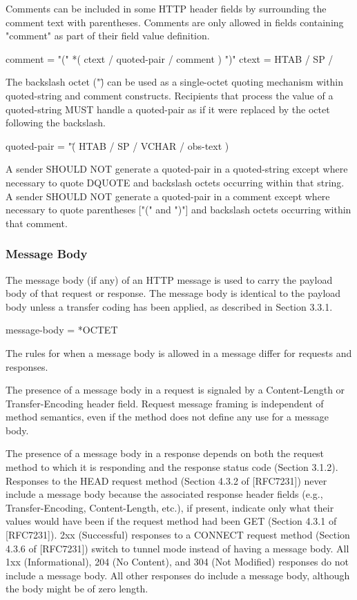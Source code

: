 Comments can be included in some HTTP header fields by surrounding
the comment text with parentheses.  Comments are only allowed in
fields containing "comment" as part of their field value definition.

  comment        = "(" *( ctext / quoted-pair / comment ) ")"
  ctext          = HTAB / SP / %

The backslash octet ("\") can be used as a single-octet quoting
mechanism within quoted-string and comment constructs.  Recipients
that process the value of a quoted-string MUST handle a quoted-pair
as if it were replaced by the octet following the backslash.

  quoted-pair    = "\" ( HTAB / SP / VCHAR / obs-text )

A sender SHOULD NOT generate a quoted-pair in a quoted-string except
where necessary to quote DQUOTE and backslash octets occurring within
that string.  A sender SHOULD NOT generate a quoted-pair in a comment
except where necessary to quote parentheses ["(" and ")"] and
backslash octets occurring within that comment.
\subsubsection{Message Body }
The message body (if any) of an HTTP message is used to carry the
payload body of that request or response.  The message body is
identical to the payload body unless a transfer coding has been
applied, as described in Section 3.3.1.

  message-body = *OCTET

The rules for when a message body is allowed in a message differ for
requests and responses.

The presence of a message body in a request is signaled by a
Content-Length or Transfer-Encoding header field.  Request message
framing is independent of method semantics, even if the method does
not define any use for a message body.

The presence of a message body in a response depends on both the
request method to which it is responding and the response status code
(Section 3.1.2).  Responses to the HEAD request method (Section 4.3.2
of [RFC7231]) never include a message body because the associated
response header fields (e.g., Transfer-Encoding, Content-Length,
etc.), if present, indicate only what their values would have been if
the request method had been GET (Section 4.3.1 of [RFC7231]). 2xx
(Successful) responses to a CONNECT request method (Section 4.3.6 of
[RFC7231]) switch to tunnel mode instead of having a message body.
All 1xx (Informational), 204 (No Content), and 304 (Not Modified)
responses do not include a message body.  All other responses do
include a message body, although the body might be of zero length.
